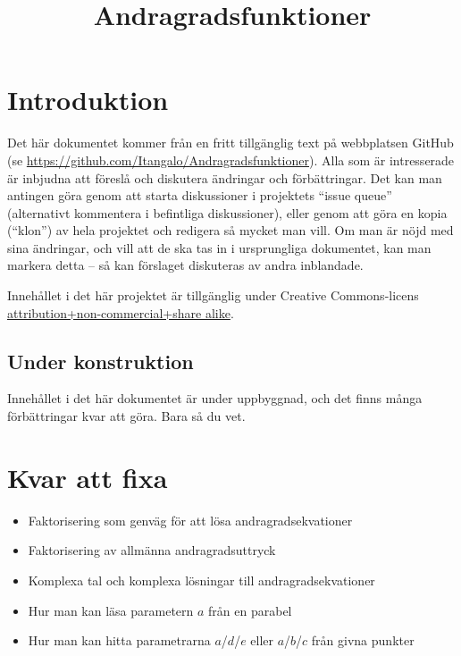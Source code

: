 \documentclass[12pt]{article}
\title{Andragradsfunktioner}
\date{}
\begin{document}
  \maketitle
  
  
  
  \section{Introduktion}
  Det här dokumentet kommer från en fritt tillgänglig text på webbplatsen GitHub (se \url{https://github.com/Itangalo/Andragradsfunktioner}).
  Alla som är intresserade är inbjudna att föreslå och diskutera ändringar och förbättringar.
  Det kan man antingen göra genom att starta diskussioner i projektets ``issue queue'' (alternativt kommentera i befintliga diskussioner), eller genom att göra en kopia (``klon'') av hela projektet och redigera så mycket man vill.
  Om man är nöjd med sina ändringar, och vill att de ska tas in i ursprungliga dokumentet, kan man markera detta -- så kan förslaget diskuteras av andra inblandade.

  Innehållet i det här projektet är tillgänglig under Creative Commons-licens \href{http://creativecommons.org/licenses/by-nc-sa/3.0/}{attribution+non-commercial+share alike}.

  \subsection{Under konstruktion}
  Innehållet i det här dokumentet är under uppbyggnad, och det finns många förbättringar kvar att göra.
  Bara så du vet.

  
  
  

  

  

  

  \section{Kvar att fixa}
  \begin{itemize}
    \item Faktorisering som genväg för att lösa andragradsekvationer
    \item Faktorisering av allmänna andragradsuttryck
    \item Komplexa tal och komplexa lösningar till andragradsekvationer
    \item Hur man kan läsa parametern $a$ från en parabel
    \item Hur man kan hitta parametrarna $a$/$d$/$e$ eller $a$/$b$/$c$ från givna punkter
  \end{itemize}
  
\end{document}
